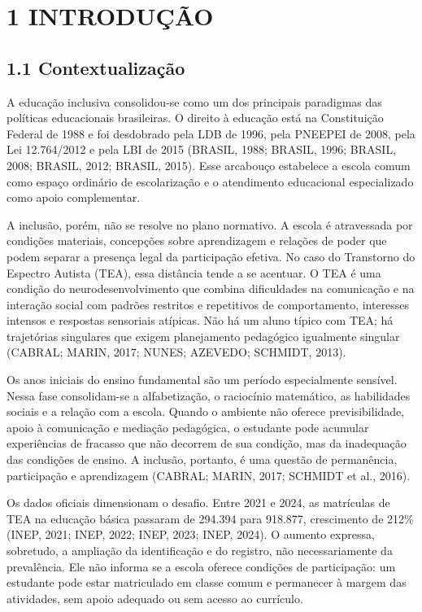 \section{1 INTRODUÇÃO}\label{introduuxe7uxe3o}

\subsection{1.1 Contextualização}\label{contextualizauxe7uxe3o}

A educação inclusiva consolidou-se como um dos principais paradigmas das
políticas educacionais brasileiras. O direito à educação está na
Constituição Federal de 1988 e foi desdobrado pela LDB de 1996, pela
PNEEPEI de 2008, pela Lei 12.764/2012 e pela LBI de 2015 (BRASIL, 1988;
BRASIL, 1996; BRASIL, 2008; BRASIL, 2012; BRASIL, 2015). Esse arcabouço
estabelece a escola comum como espaço ordinário de escolarização e o
atendimento educacional especializado como apoio complementar.

A inclusão, porém, não se resolve no plano normativo. A escola é
atravessada por condições materiais, concepções sobre aprendizagem e
relações de poder que podem separar a presença legal da participação
efetiva. No caso do Transtorno do Espectro Autista (TEA), essa distância
tende a se acentuar. O TEA é uma condição do neurodesenvolvimento que
combina dificuldades na comunicação e na interação social com padrões
restritos e repetitivos de comportamento, interesses intensos e
respostas sensoriais atípicas. Não há um aluno típico com TEA; há
trajetórias singulares que exigem planejamento pedagógico igualmente
singular (CABRAL; MARIN, 2017; NUNES; AZEVEDO; SCHMIDT, 2013).

Os anos iniciais do ensino fundamental são um período especialmente
sensível. Nessa fase consolidam-se a alfabetização, o raciocínio
matemático, as habilidades sociais e a relação com a escola. Quando o
ambiente não oferece previsibilidade, apoio à comunicação e mediação
pedagógica, o estudante pode acumular experiências de fracasso que não
decorrem de sua condição, mas da inadequação das condições de ensino. A
inclusão, portanto, é uma questão de permanência, participação e
aprendizagem (CABRAL; MARIN, 2017; SCHMIDT et al., 2016).

Os dados oficiais dimensionam o desafio. Entre 2021 e 2024, as
matrículas de TEA na educação básica passaram de 294.394 para 918.877,
crescimento de 212\% (INEP, 2021; INEP, 2022; INEP, 2023; INEP, 2024). O
aumento expressa, sobretudo, a ampliação da identificação e do registro,
não necessariamente da prevalência. Ele não informa se a escola oferece
condições de participação: um estudante pode estar matriculado em classe
comum e permanecer à margem das atividades, sem apoio adequado ou sem
acesso ao currículo.

